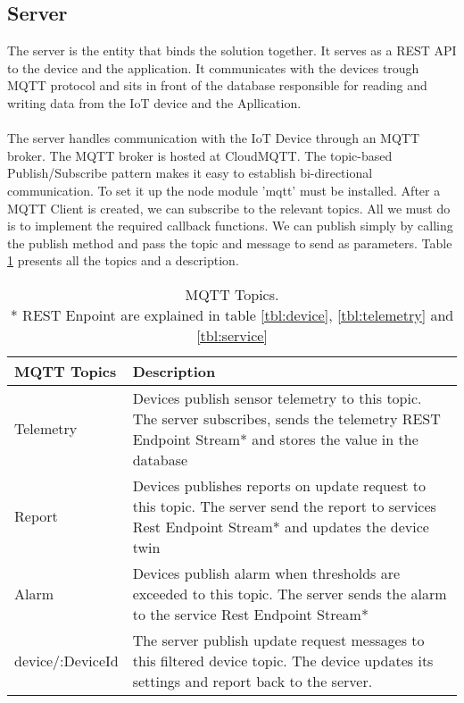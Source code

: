 \subsection{Server}
The server is the entity that binds the solution together. It serves as a REST API to the device and the application. It communicates with the devices trough MQTT protocol and sits in front of the database responsible for reading and writing data from the IoT device and the Apllication. \\\\ The server handles communication with the IoT Device through an MQTT broker. The MQTT broker is hosted at CloudMQTT. The topic-based Publish/Subscribe pattern makes it easy to establish bi-directional communication. To set it up the node module 'mqtt' must be installed. After a MQTT Client is created, we can subscribe to the relevant topics. All we must do is to implement the required callback functions. We can publish simply by calling the publish method and pass the topic and message to send as parameters. Table \ref{tbl:topics} presents all the topics and a description.

\begin{table}[H]
    \centering
    \begin{tabular}{|l|p{10cm}|}
    \hline
    \textbf{MQTT Topics}    & \textbf{Description} \\ \hline
    Telemetry & Devices publish sensor telemetry to this topic. The server subscribes, sends the telemetry REST Endpoint Stream* and stores the value in the database \\ \hline
    Report & Devices publishes reports on update request to this topic. The server send the report to services Rest Endpoint Stream* and updates the device twin \\ \hline
    Alarm & Devices publish alarm when thresholds are exceeded to this topic. The server sends the alarm to the service Rest Endpoint Stream* \\ \hline
    device/:DeviceId & The server publish update request messages to this filtered device topic. The device updates its settings and report back to the server. \\ \hline
    \end{tabular}
    \caption{MQTT Topics.\\ * REST Enpoint are explained in table \ref{tbl:device}, \ref{tbl:telemetry} and \ref{tbl:service}}
    \label{tbl:topics}
\end{table}

